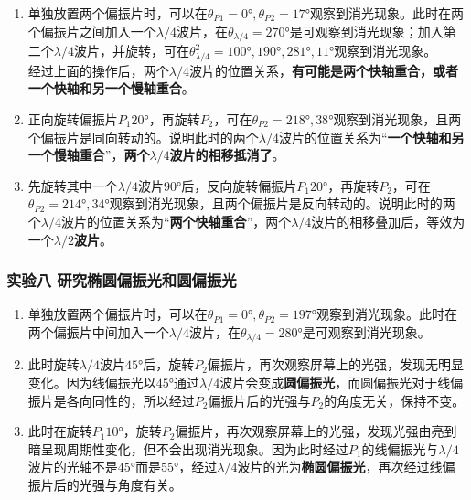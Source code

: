 \documentclass[dvipsnames, svgnames,a4paper,11pt]{article}
\begin{document}
	\begin{enumerate}
		\item  单独放置两个偏振片时，可以在$\theta_{P1}=\ang{0},\theta_{P2}=\ang{17}$观察到消光现象。此时在两个偏振片之间加入一个$\lambda/4$波片，在$\theta_{\lambda/4}=\ang{270}$是可观察到消光现象；加入第二个$\lambda/4$波片，并旋转，可在$\theta^2_{\lambda/4}=\ang{100},\ang{190},\ang{281},\ang{11}$观察到消光现象。\\
		
			经过上面的操作后，两个$\lambda/4$波片的位置关系，\textbf{有可能是两个快轴重合，或者一个快轴和另一个慢轴重合}。

		\item 正向旋转偏振片$P_1\ang{20}$，再旋转$P_2$，可在$\theta_{P2}=\ang{218},\ang{38}$观察到消光现象，且两个偏振片是同向转动的。说明此时的两个$\lambda/4$波片的位置关系为“\textbf{一个快轴和另一个慢轴重合}”，\textbf{两个$\lambda/4$波片的相移抵消了}。
		\item 先旋转其中一个$\lambda/4$波片$\ang{90}$后，反向旋转偏振片$P_1\ang{20}$，再旋转$P_2$，可在$\theta_{P2}=\ang{214},\ang{34}$观察到消光现象，且两个偏振片是反向转动的。说明此时的两个$\lambda/4$波片的位置关系为“\textbf{两个快轴重合}”，两个$\lambda/4$波片的相移叠加后，等效为一个\textbf{$\lambda/2$波片}。
	\end{enumerate}








	\subsubsection{实验八 \quad 研究椭圆偏振光和圆偏振光}

	\begin{enumerate}
		\item 单独放置两个偏振片时，可以在$\theta_{P1}=\ang{0},\theta_{P2}=\ang{197}$观察到消光现象。此时在两个偏振片中间加入一个$\lambda/4$波片，在$\theta_{\lambda/4}=\ang{280}$是可观察到消光现象。	\\
		\item 此时旋转$\lambda/4$波片$\ang{45}$后，旋转$P_2$偏振片，再次观察屏幕上的光强，发现无明显变化。因为线偏振光以$\ang{45}$通过$\lambda/4$波片会变成\textbf{圆偏振光}，而圆偏振光对于线偏振片是各向同性的，所以经过$P_2$偏振片后的光强与$P_2$的角度无关，保持不变。
		\item 此时在旋转$P_1\ang{10}$，旋转$P_2$偏振片，再次观察屏幕上的光强，发现光强由亮到暗呈现周期性变化，但不会出现消光现象。因为此时经过$P_1$的线偏振光与$\lambda/4$波片的光轴不是$\ang{45}$而是$\ang{55}$，经过$\lambda/4$波片的光为\textbf{椭圆偏振光}，再次经过线偏振片后的光强与角度有关。
	\end{enumerate}
\end{document}
